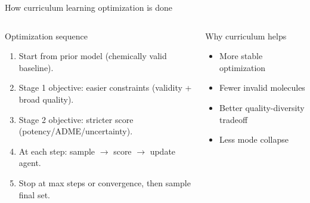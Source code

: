 \documentclass[aspectratio=169,10pt]{beamer}
\begin{document}
\begin{frame}{How curriculum learning optimization is done}
  \begin{columns}[T]
      \begin{block}{Optimization sequence}
        \begin{enumerate}
          \item Start from prior model (chemically valid baseline).
          \item Stage 1 objective: easier constraints (validity + broad quality).
          \item Stage 2 objective: stricter score (potency/ADME/uncertainty).
          \item At each step: sample \(\rightarrow\) score \(\rightarrow\) update agent.
          \item Stop at max steps or convergence, then sample final set.
        \end{enumerate}
      \end{block}
      \begin{block}{Why curriculum helps}
        \begin{itemize}
          \item More stable optimization
          \item Fewer invalid molecules
          \item Better quality-diversity tradeoff
          \item Less mode collapse
        \end{itemize}
      \end{block}
  \end{columns}
\end{frame}
\end{document}

